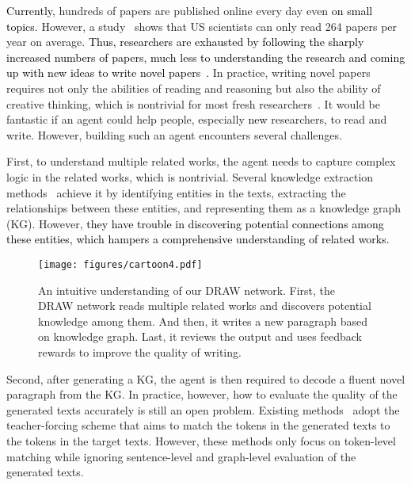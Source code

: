 \documentclass[letterpaper]{article}
\def\hmg{\textcolor{black}}
\begin{document}
\hmg{Currently,}
hundreds of papers are published online every day even 
\hmg{on small topics.}
However, a study~\cite{Wang2019PaperRobotID} shows that US scientists can only read 264 papers per year on average.
\hmg{Thus, researchers are exhausted by following the sharply increased numbers of papers, much less to understanding the research and coming up with new ideas to write novel papers~\cite{Gopen1990TheSO,Buenz2019EssentialEF}.}
In practice, writing novel papers requires not only the abilities of reading and reasoning but also the ability of creative thinking, which is nontrivial for most fresh researchers~\cite{DBLP:conf/aaai/XiaoWHJ20}. It would be fantastic if an agent could help people, especially \hmg{new} researchers, to read and write. However, building such an agent encounters several challenges.


First, to understand multiple related works, the agent needs to capture complex logic in the related works, which is nontrivial.
Several knowledge extraction methods~\cite{zhang-etal-2006-composite,gerber-chai-2010-beyond,Yoshikawa2010CoreferenceBE} achieve it by identifying entities in the texts, extracting the relationships between these entities, and representing them as a knowledge graph (KG).
However, 
\hmg{they have trouble in discovering potential connections among these entities, which hampers a comprehensive understanding of related works.}



\begin{figure}[t]
    \texttt{[image: figures/cartoon4.pdf]}
    \caption{An intuitive understanding of our DRAW network. First, the DRAW network reads multiple related works and discovers potential knowledge among them. And then, it writes a new paragraph based on knowledge graph. Last, it reviews the output and uses feedback rewards to improve the quality of writing.}
    \label{fig:simple_framework}
\end{figure}



Second, after generating a KG, the agent is then required to decode a fluent novel paragraph from the KG. In practice, however, how to evaluate the quality of the generated texts accurately is still an open problem. Existing methods~\cite{KoncelKedziorski2019TextGF,Wang2019PaperRobotID}
adopt the teacher-forcing scheme that aims to match the tokens in the generated texts to the tokens in the target texts.
However, these methods only focus on token-level matching while ignoring sentence-level and graph-level evaluation of the generated texts.
\end{document}
